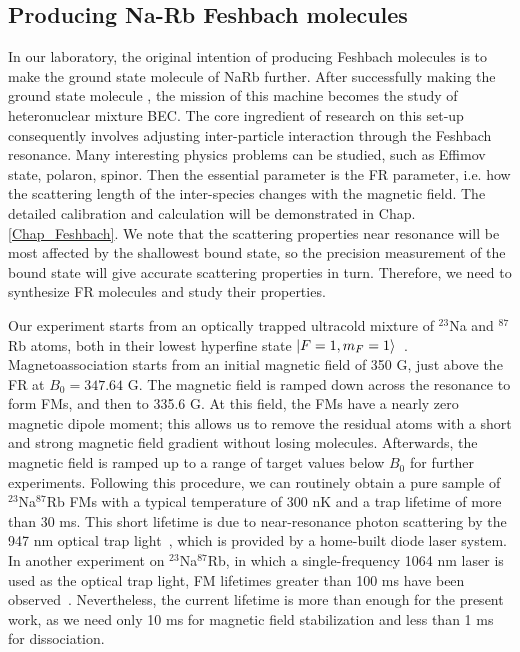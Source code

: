 \subsection{Producing Na-Rb Feshbach molecules}
In our laboratory, the original intention of producing Feshbach molecules is to make the ground state molecule of NaRb further. After successfully making the ground state molecule \cite{PhysRevLett.116.205303}, the mission of this machine becomes the study of heteronuclear mixture BEC. The core ingredient of research on this set-up consequently involves adjusting inter-particle interaction through the Feshbach resonance. Many interesting physics problems can be studied, such as Effimov state, polaron, spinor. Then the essential parameter is the FR parameter, i.e. how the scattering length of the inter-species changes with the magnetic field. The detailed calibration and calculation will be demonstrated in Chap. \ref{Chap_Feshbach}. We note that the scattering properties near resonance will be most affected by the shallowest bound state, so the precision measurement of the bound state will give accurate scattering properties in turn. Therefore, we need to synthesize FR molecules and study their properties.

Our experiment starts from an optically trapped ultracold mixture of $^{23}$Na and $^{87}$Rb atoms, both in their lowest hyperfine state $\ket{F = 1, m_F = 1}$~\cite{wang2013observation,wang2015formation,jia2020}. Magnetoassociation starts from an initial magnetic field of 350 G, just above the FR at $B_0 = 347.64$ G. The magnetic field is ramped down across the resonance to form FMs, and then to 335.6 G. At this field, the FMs have a nearly zero magnetic dipole moment; this allows us to remove the residual atoms with a short and strong magnetic field gradient without losing molecules. Afterwards, the magnetic field is ramped up to a range of target values below $B_0$ for further experiments. Following this procedure, we can routinely obtain a pure sample of $^{23}$Na$^{87}$Rb FMs with a typical temperature of 300 nK and a trap lifetime of more than 30 ms. This short lifetime is due to near-resonance photon scattering by the 947 nm optical trap light~\cite{Guo2017,jia2020}, which is provided by a home-built diode laser system. In another experiment on $^{23}$Na$^{87}$Rb, in which a single-frequency 1064 nm laser is used as the optical trap light, FM lifetimes greater than 100 ms have been observed~\cite{Wang2019,guo2021leehuangyang}. Nevertheless, the current lifetime is more than enough for the present work, as we need only 10 ms for magnetic field stabilization and less than 1 ms for dissociation.

